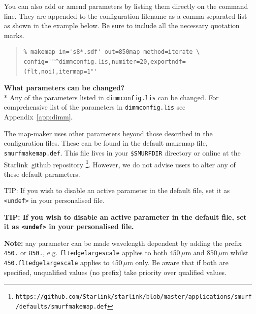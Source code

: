 \documentclass[twoside,11pt]{article}
\newcommand{\htmladdnormallink}[2]{#1}
\newcommand{\htmlref}[2]{#1}
\newenvironment{latexonly}{}{}
\newcommand{\latex}[1]{#1}
\newcommand{\latexhtml}[2]{#1}
\renewcommand{\_}{\texttt{\symbol{95}}}
\newenvironment{fmpage}[1]{\begin{lrbox}{\fmbox}\begin{minipage}{#1}}{\end{minipage}\end{lrbox}\fbox{\usebox{\fmbox}}}
\newenvironment{myquote}{
   \color{MidnightBlue}\begin{quote}\begin{small}}{
   \end{small}\end{quote}
}
\newcommand{\starlink}{\htmladdnormallink{Starlink}{http://starlink.jach.hawaii.edu}}
\newcommand{\param}[1]{\texttt{#1}}
\newcommand{\file}[1]{\texttt{#1}}
\newcommand{\url}[1]{\texttt{#1}}
\newcommand{\cref}[3]{\latexhtml{#1~\ref{#2}}{\htmlref{#3}{#2}}}
\renewenvironment{myquote}{
      \begin{quote}\begin{small}}{
      \end{small}\end{quote}
   }
\begin{document}
You can also add or amend parameters by listing them directly on the
command line. They are appended to the configuration filename as a
comma separated list as shown in the example below. Be sure to include
all the necessary quotation marks.

\begin{myquote}
\begin{verbatim}
% makemap in='s8*.sdf' out=850map method=iterate \
config='"^dimmconfig.lis,numiter=20,exportndf=(flt,noi),itermap=1"'
\end{verbatim}
\end{myquote}

\textbf{What parameters can be changed?}\\*
Any of the parameters listed in \file{dimmconfig.lis} can be
changed. For comprehensive list of the parameters in
\file{dimmconfig.lis} see \cref{Appendix}{app:dimm}{an appendix}.

The map-maker uses other parameters beyond those described in the
configuration files. These can be found in the default makemap file,
\file{smurf\_makemap.def}. This file lives in your \file{\$SMURF\_DIR}
directory or online at the \starlink\ \htmladdnormallink{github
repository}{https://github.com/Starlink/starlink/blob/master/applications/smurf/defaults/smurf\_makemap.def}
\latex{\footnote{\url{https://github.com/Starlink/starlink/blob/master/applications/smurf/defaults/smurf\_makemap.def}}}.
 However, we do not advise users to alter any of these default parameters.

\begin{latexonly}
\begin{center}
\begin{fmpage}{0.95\linewidth}
\vspace{0.1cm}
TIP: If you wish to disable an active parameter in the default file,
set it as \param{<undef>} in your personalised file.
\end{fmpage}
\end{center}
\end{latexonly}

\begin{htmlonly}
\textbf{TIP: If you wish to disable an active parameter in the default
file, set it as \param{<undef>} in your personalised file.}
\end{htmlonly}


\textbf{Note:} any parameter can be made wavelength dependent by
adding the prefix \param{450.} or \param{850.}, e.g.
\param{flt\_edge\_largescale} applies to both 450\,$\mu$m and
850\,$\mu$m whilst \param{450.flt\_edge\_largescale} applies to
450\,$\mu$m only. Be aware that if both are specified, unqualified
values (no prefix) take priority over qualified values.
\end{document}

